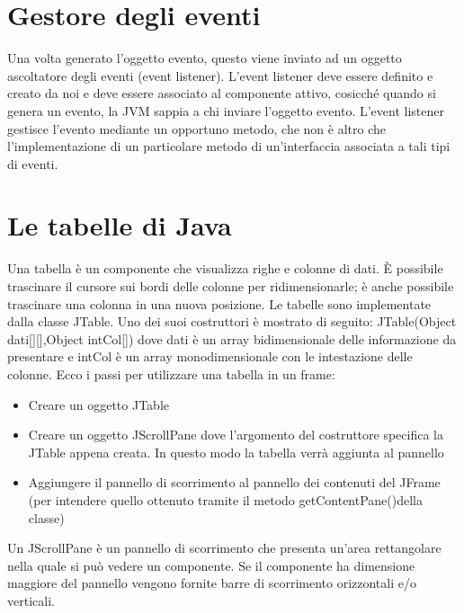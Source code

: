 \section{Gestore degli eventi}
Una volta generato l’oggetto evento, questo viene inviato ad un oggetto ascoltatore degli eventi (event listener).
L’event listener deve essere definito e creato da noi e deve essere associato al componente attivo, cosicché quando si genera un evento, la JVM sappia a chi inviare l’oggetto evento.
L’event listener gestisce l’evento mediante un opportuno metodo, che non è altro che l’implementazione di un particolare metodo di un’interfaccia associata a tali tipi
di eventi.


\section{Le tabelle di Java}
Una tabella è un componente che visualizza righe e colonne di dati. È possibile trascinare il cursore sui bordi delle colonne per ridimensionarle; è anche possibile trascinare una colonna in una nuova posizione. Le tabelle sono implementate dalla classe JTable.
Uno dei suoi costruttori è mostrato di seguito:
JTable(Object dati[][],Object intCol[])
dove dati è un array bidimensionale delle informazione da presentare e intCol è un array
monodimensionale con le intestazione delle colonne.
Ecco i passi per utilizzare una tabella in un frame:
\begin{itemize}
\item Creare un oggetto JTable
\item Creare un oggetto JScrollPane dove l'argomento del costruttore specifica la JTable appena creata. In questo modo la tabella verrà aggiunta al pannello
\item Aggiungere il pannello di scorrimento al pannello dei contenuti del JFrame (per intendere quello ottenuto tramite il metodo getContentPane()della classe)
\end{itemize}
Un JScrollPane è un pannello di scorrimento che presenta un'area rettangolare nella quale si può vedere un componente. Se il componente ha dimensione maggiore del pannello vengono fornite barre di scorrimento orizzontali e/o verticali.

